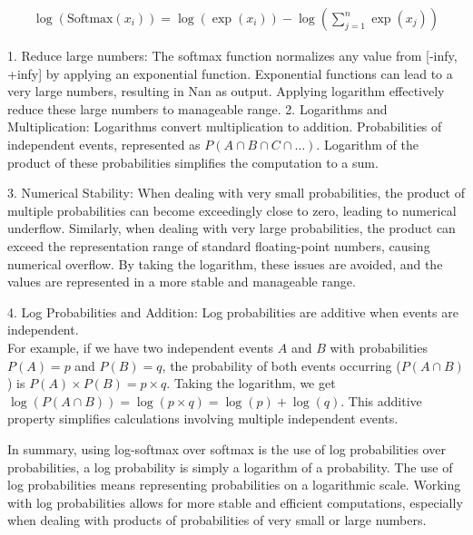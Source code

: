 \begin{align}
    \log(\text{Softmax}(x_i)) = \log(\exp(x_i)) - \log\left(\sum_{j=1}^n \exp(x_j)\right)
\end{align}

1. Reduce large numbers:  The softmax function normalizes any value from [-infy, +infy] by applying an exponential function. Exponential functions can lead to a very large numbers, resulting in  Nan as output. Applying logarithm effectively reduce these large numbers to manageable range.
2. Logarithms and Multiplication: Logarithms convert multiplication to addition. Probabilities of independent events,  represented as \(P(A \cap B \cap C \cap \ldots)\). Logarithm of the product of these probabilities simplifies the computation to a sum. 

3. Numerical Stability: When dealing with very small probabilities, the product of multiple probabilities can become exceedingly close to zero, leading to numerical underflow. Similarly, when dealing with very large probabilities, the product can exceed the representation range of standard floating-point numbers, causing numerical overflow. By taking the logarithm, these issues are avoided, and the values are represented in a more stable and manageable range.

4. Log Probabilities and Addition: Log probabilities are additive when events are independent.\\ For example, if we have two independent events \(A\) and \(B\) with probabilities \(P(A) = p\) and \(P(B) = q\), the probability of both events occurring (\(P(A \cap B)\)) is \(P(A) \times P(B) = p \times q\). Taking the logarithm, we get \(\log(P(A \cap B)) = \log(p \times q) = \log(p) + \log(q)\). This additive property simplifies calculations involving multiple independent events.

In summary, using log-softmax over softmax is the use of log probabilities over probabilities, a log probability is simply a logarithm of a probability. The use of log probabilities means representing probabilities on a logarithmic scale. Working with log probabilities allows for more stable and efficient computations, especially when dealing with products of probabilities of very small or large numbers. 